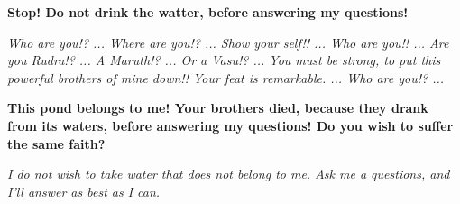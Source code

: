 \textbf{ Stop! Do not drink the watter, before answering my questions! }\medskip 

\textit{ Who are you!? ... Where are you!? ... Show your self!! ... Who are you!! ... Are you Rudra!? ... A Maruth!? ... Or a Vasu!? ... You must be strong, to put this powerful brothers of mine down!! Your feat is remarkable. ... Who are you!? ... }\medskip 

\textbf{ This pond belongs to me! Your brothers died, because they drank from its waters, before answering my questions! Do you wish to suffer the same faith? }\medskip 

\textit{ I do not wish to take water that does not belong to me. Ask me a questions, and I'll answer as best as I can. } 